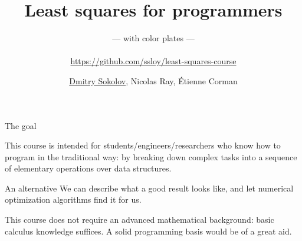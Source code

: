 \documentclass[UKenglish,aspectratio=169]{beamer}
\author[Dmitry Sokolov]{\underline{Dmitry Sokolov}, Nicolas Ray, Étienne Corman}
\title{Least squares for programmers}
\subtitle{--- with color plates ---\\
~\\
\url{https://github.com/ssloy/least-squares-course}
}
\begin{document}


\begin{frame}{The goal}

This course is intended for students/engineers/researchers who know how to program in the traditional way:
by breaking down complex tasks into a sequence of elementary operations over data structures.

\vspace{2ex}

\begin{block}{An alternative}
We can describe what a good result looks like, and let numerical optimization algorithms find it for us.
\end{block}

\vspace{2ex}

This course does not require an advanced mathematical background: basic calculus knowledge suffices. A solid programming basis would be of a great aid.
\end{frame}
\end{document}
